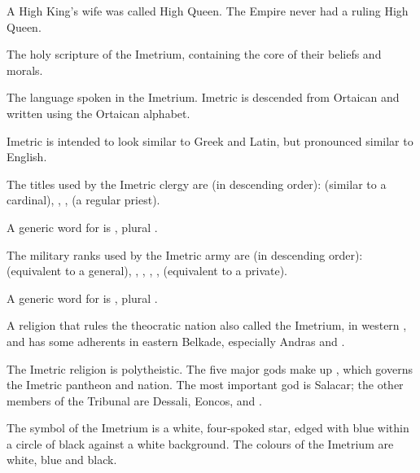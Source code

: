 \begin{gloss}
A High King's wife was called High Queen. The Empire never had a ruling High Queen.



\gitemthe{\Imetriad}
The holy scripture of the Imetrium, containing the core of their beliefs and morals. 



The language spoken in the Imetrium. Imetric is descended from Ortaican and written using the Ortaican alphabet. 

Imetric is intended to look similar to Greek and Latin, but pronounced similar to English. 



The titles used by the Imetric clergy are (in descending order): 
\Laccorin{} (similar to a cardinal),
\Ispan,
\Telphan,
\Amra{} (a regular priest).

A generic word for  is \Stracos, plural \Stracoi. 



The military ranks used by the Imetric army are (in descending order): 
\Deccor{} (equivalent to a general), 
\Retaxis{}, 
\Salican{}, 
\Vexstra{}, 
\Corphin{}, 
\Inclan{} (equivalent to a private). 

A generic word for  is \Rengos, plural \Rengoi. 



A religion that rules the theocratic nation also called the Imetrium, in western \Azmith, and has some adherents in eastern Belkade, especially Andras and \Scyrum{}. 

The Imetric religion is polytheistic. The five major gods make up , which governs the Imetric pantheon and nation. The most important god is Salacar; the other members of the Tribunal are Dessali, Eoncos, \NishiS{} and \Hiothrex{}. 

The symbol of the Imetrium is a white, four-spoked star, edged with blue within a circle of black against a white background. The colours of the Imetrium are white, blue and black. 





\end{gloss}
